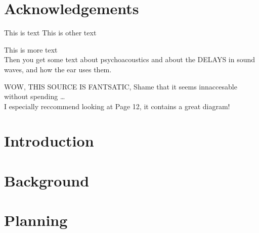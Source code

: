 \documentclass[a4paper, 12pt]{report}
\begin{document}


\abstract{}
\setcounter{page}{2}

\tableofcontents
{}

\listoffigures
{}

\listoftables
{}

\chapter*{Acknowledgements}


This is text \cite{EMHeadsets}
This is other text \cite{EMNoiseCancel}

This is more \cite{ICAAlg&Apps} text\\
Then you get some text about psychoacoustics \cite{MusCogCompSou} and about the DELAYS in sound waves, and how the ear uses them.

WOW, THIS SOURCE\cite{AdvancedDSPing} IS FANTSATIC, Shame that it seems innaccesable without spending \ldots \\
I especially reccommend looking at Page 12, it contains a great diagram!

\chapter{Introduction}


\chapter{Background}







\chapter{Planning}










\end{document}
